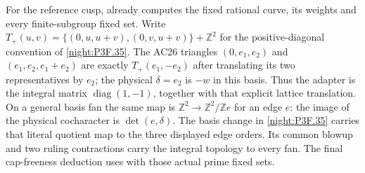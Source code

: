 \begin{remark}
For the reference cusp, \cite[Proposition~9.24 and
Remarks~9.25--9.26, pp.~82--83]{AC26} already computes the fixed
rational curve, its weights and every finite-subgroup fixed set.
Write $T_+(u,v)=\{(0,u,u+v),(0,v,u+v)\}+\mathbb Z^2$
for the positive-diagonal convention of \cref{night:P3F.35}.
The AC26 triangles $(0,e_1,e_2)$ and $(e_1,e_2,e_1+e_2)$ are exactly
$T_+(e_1,-e_2)$ after translating its two representatives by $e_2$;
the physical $\delta=e_2$ is $-w$ in this basis. Thus the adapter
is the integral matrix $\operatorname{diag}(1,-1)$, together with
that explicit lattice translation.
On a general basis fan the same map is
$\mathbb Z^2\to\mathbb Z^2/\mathbb Ze$ for an edge $e$:
the image of the physical cocharacter is $\det(e,\delta)$.
The basis change in \cref{night:P3F.35} carries that literal quotient
map to the three displayed edge orders. Its common blowup and two
ruling contractions carry the integral topology to every fan.
The final cap-freeness deduction uses
\cite[Theorem~4.4, p.~146; coefficient convention p.~139]{Floyd1952}
with those actual prime fixed sets.
\end{remark}
